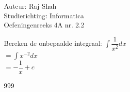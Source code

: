 \documentclass[a4paper]{article}
\begin{document}
  
\noindent \large Auteur: Raj Shah \\
\noindent \large Studierichting: Informatica\\
\noindent \large Oefeningenreeks 4A nr. 2.2 \\

\medskip

\normalsize
Bereken de onbepaalde integraal: $\displaystyle\int \dfrac{1}{x^2} dx$\\

$ = \displaystyle\int x^{-2}dx $\\

$ = - \dfrac{1}{x} + c$

\begin{thebibliography}{999}
\end{thebibliography}
\end{document}
